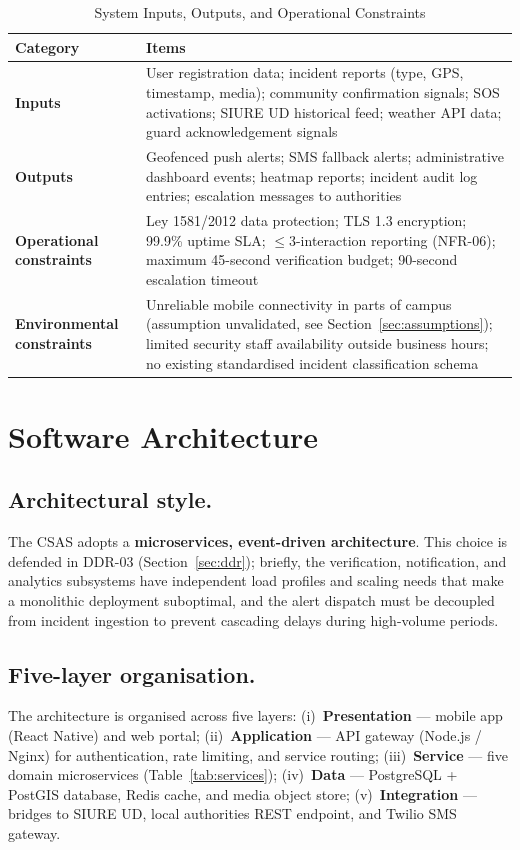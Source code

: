 \documentclass[12pt,a4paper]{article}
\begin{document}
\begin{table}[h]
\caption{System Inputs, Outputs, and Operational Constraints}
\label{tab:ioc}
\centering
\begin{tabularx}{\textwidth}{lX}
\toprule
\textbf{Category} & \textbf{Items} \\
\midrule
\textbf{Inputs} & User registration data; incident reports (type, GPS, timestamp, media); community confirmation signals; SOS activations; SIURE UD historical feed; weather API data; guard acknowledgement signals \\
\textbf{Outputs} & Geofenced push alerts; SMS fallback alerts; administrative dashboard events; heatmap reports; incident audit log entries; escalation messages to authorities \\
\textbf{Operational constraints} & Ley 1581/2012 data protection; TLS 1.3 encryption; 99.9\% uptime SLA; $\leq$3-interaction reporting (NFR-06); maximum 45-second verification budget; 90-second escalation timeout \\
\textbf{Environmental constraints} & Unreliable mobile connectivity in parts of campus (assumption unvalidated, see Section~\ref{sec:assumptions}); limited security staff availability outside business hours; no existing standardised incident classification schema \\
\bottomrule
\end{tabularx}
\end{table}

\section{Software Architecture}
\label{sec:softarch}

\subsection{Architectural style.}
The CSAS adopts a \textbf{microservices, event-driven architecture}.
This choice is defended in DDR-03 (Section~\ref{sec:ddr}); briefly,
the verification, notification, and analytics subsystems have
independent load profiles and scaling needs that make a monolithic
deployment suboptimal, and the alert dispatch must be decoupled from
incident ingestion to prevent cascading delays during high-volume
periods.

\subsection{Five-layer organisation.}
The architecture is organised across five layers:
(i)~\textbf{Presentation} --- mobile app (React Native) and web
portal;
(ii)~\textbf{Application} --- API gateway (Node.js / Nginx) for
authentication, rate limiting, and service routing;
(iii)~\textbf{Service} --- five domain microservices
(Table~\ref{tab:services});
(iv)~\textbf{Data} --- PostgreSQL + PostGIS database, Redis cache,
and media object store;
(v)~\textbf{Integration} --- bridges to SIURE UD, local authorities
REST endpoint, and Twilio SMS gateway.
\end{document}
